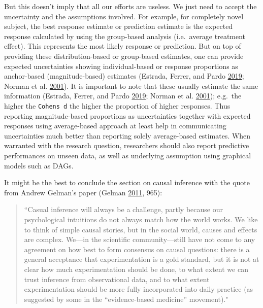 \documentclass[
]{book}
\begin{document}
But this doesn't imply that all our efforts are useless. We just need to accept the uncertainty and the assumptions involved. For example, for completely novel subject, the best response estimate or prediction estimate is the expected response calculated by using the group-based analysis (i.e.~average treatment effect). This represents the most likely response or prediction. But on top of providing these distribution-based or group-based estimates, one can provide expected uncertainties showing individual-based or response proportions as anchor-based (magnitude-based) estimates (Estrada, Ferrer, and Pardo \protect\hyperlink{ref-estradaStatisticsEvaluatingPrepost2019}{2019}; Norman et al. \protect\hyperlink{ref-normanRelationDistributionAnchorBased2001}{2001}). It is important to note that these usually estimate the same information (Estrada, Ferrer, and Pardo \protect\hyperlink{ref-estradaStatisticsEvaluatingPrepost2019}{2019}; Norman et al. \protect\hyperlink{ref-normanRelationDistributionAnchorBased2001}{2001}); e.g.~the higher the \texttt{Cohen\textquotesingle{}s\ d} the higher the proportion of higher responses. Thus reporting magnitude-based proportions as uncertainties together with expected responses using average-based approach at least help in communicating uncertainties much better than reporting solely average-based estimates. When warranted with the research question, researchers should also report predictive performances on unseen data, as well as underlying assumption using graphical models such as DAGs.

It might be the best to conclude the section on causal inference with the quote from Andrew Gelman's paper (Gelman \protect\hyperlink{ref-gelmanCausalityStatisticalLearning2011}{2011}, 965):

\begin{quote}
``Casual inference will always be a challenge, partly because our psychological intuitions do not always match how the world works. We like to think of simple causal stories, but in the social world, causes and effects are complex. We---in the scientific community---still have not come to any agreement on how best to form consensus on causal questions: there is a general acceptance that experimentation is a gold standard, but it is not at clear how much experimentation should be done, to what extent we can trust inference from observational data, and to what extent experimentation should be more fully incorporated into daily practice (as suggested by some in the ``evidence-based medicine'' movement)."
\end{quote}
\end{document}
